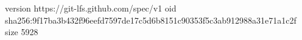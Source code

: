 version https://git-lfs.github.com/spec/v1
oid sha256:9f17ba3b432f96eefd7597de17c5d6b8151c90353f5c3ab912988a31e71a1c2f
size 5928
